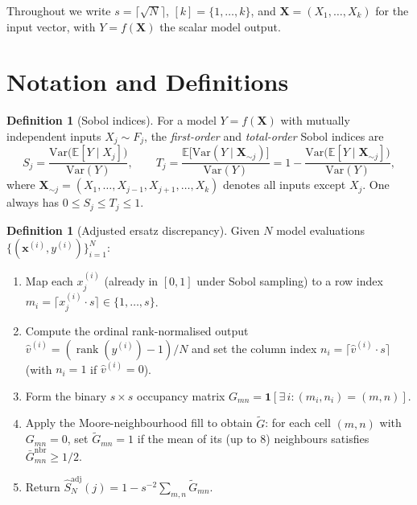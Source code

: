 \documentclass[11pt,a4paper]{article}
\theoremstyle{definition}
\newtheorem{definition}[theorem]{Definition}
\newcommand{\E}{\mathbb{E}}
\newcommand{\Var}{\mathrm{Var}}
\newcommand{\Ind}{\mathbf{1}}
\newcommand{\bx}{\mathbf{x}}
\newcommand{\bX}{\mathbf{X}}
\newcommand{\ceil}[1]{\lceil #1 \rceil}
\DeclareMathOperator{\rank}{rank}
\begin{document}
Throughout we write $s = \ceil{\sqrt{N}}$, $[k] = \{1,\ldots,k\}$, and
$\bX = (X_1,\ldots,X_k)$ for the input vector, with $Y = f(\bX)$ the
scalar model output.

\section{Notation and Definitions}

\begin{definition}[Sobol indices]
For a model $Y = f(\bX)$ with mutually independent inputs
$X_j \sim F_j$, the \emph{first-order} and \emph{total-order} Sobol
indices are
\[
  S_j = \frac{\Var\!\bigl(\E[Y \mid X_j]\bigr)}{\Var(Y)}, \qquad
  T_j = \frac{\E\!\bigl[\Var(Y \mid \bX_{\sim j})\bigr]}{\Var(Y)}
      = 1 - \frac{\Var\!\bigl(\E[Y \mid \bX_{\sim j}]\bigr)}{\Var(Y)},
\]
where $\bX_{\sim j} = (X_1,\ldots,X_{j-1},X_{j+1},\ldots,X_k)$ denotes
all inputs except $X_j$.  One always has $0 \le S_j \le T_j \le 1$.
\end{definition}

\begin{definition}[Adjusted ersatz discrepancy]
\label{def:adj-ersatz}
Given $N$ model evaluations $\{(\bx^{(i)}, y^{(i)})\}_{i=1}^N$:
\begin{enumerate}[label=(\roman*)]
  \item Map each $x_j^{(i)}$ (already in $[0,1]$ under Sobol sampling)
        to a row index $m_i = \ceil{x_j^{(i)} \cdot s} \in \{1,\ldots,s\}$.
  \item Compute the ordinal rank-normalised output
        $\hat{v}^{(i)} = (\rank(y^{(i)}) - 1)/N$
        and set the column index $n_i = \ceil{\hat{v}^{(i)} \cdot s}$
        (with $n_i = 1$ if $\hat{v}^{(i)} = 0$).
  \item Form the binary $s \times s$ occupancy matrix
        $G_{mn} = \Ind[\exists\, i : (m_i, n_i) = (m, n)]$.
  \item Apply the Moore-neighbourhood fill to obtain $\tilde{G}$:
        for each cell $(m,n)$ with $G_{mn} = 0$, set
        $\tilde{G}_{mn} = 1$ if the mean of its (up to 8) neighbours
        satisfies $\bar{G}_{mn}^{\mathrm{nbr}} \ge 1/2$.
  \item Return $\hat{S}^{\mathrm{adj}}_N(j) = 1 - s^{-2}\sum_{m,n}\tilde{G}_{mn}$.
\end{enumerate}
\end{definition}
\end{document}
